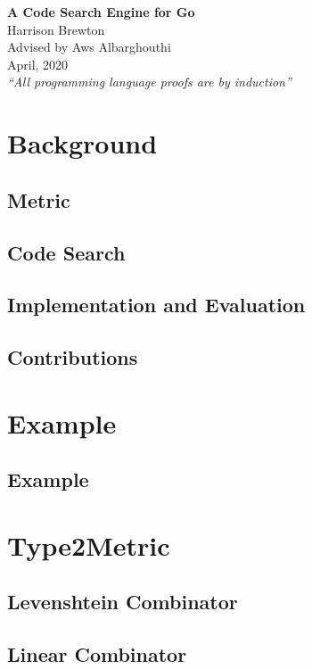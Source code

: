 \documentclass[12pt]{article}
\theoremstyle{plain}
\begin{document}
{\centering \Huge \textbf{A Code Search Engine for Go} \\ 
\vspace{0.5cm}
\Large
Harrison Brewton \\
Advised by Aws Albarghouthi \\ 
April, 2020 \\
\normalsize
\vspace{0.1cm} \textit{``All programming language proofs are by induction''} \vspace{0.1cm} \par
}

\section{Background}
\subsection{Metric}

\subsection{Code Search}

\subsection{Implementation and Evaluation}

\subsection{Contributions}

\section{Example}

\subsection{Example}

\section{Type2Metric}

\subsection{Levenshtein Combinator}

\subsection{Linear Combinator}

\end{document}
